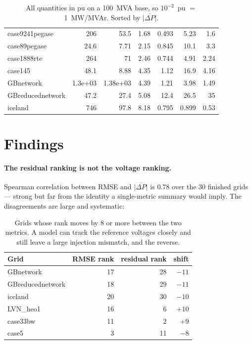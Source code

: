 \documentclass[10pt]{article}
\begin{document}
\begin{table}[H]
\begin{tabular}{lrrrrrr}
case9241pegase & 206 & 53.5 & 1.68 & 0.493 & 5.23 & 1.6 \\
case89pegase & 24.6 & 7.71 & 2.15 & 0.845 & 10.1 & 3.3 \\
case1888rte & 264 & 71 & 2.46 & 0.744 & 4.91 & 2.24 \\
case145 & 48.1 & 8.88 & 4.35 & 1.12 & 16.9 & 4.16 \\
GBnetwork & 1.3e+03 & 1.38e+03 & 4.39 & 1.21 & 3.98 & 1.49 \\
GBreducednetwork & 47.2 & 27.4 & 5.08 & 12.4 & 26.5 & 35 \\
iceland & 746 & 97.8 & 8.18 & 0.795 & 0.899 & 0.53 \\
\bottomrule
\end{tabular}
\caption{All quantities in pu on a 100~MVA base, so $10^{-2}$~pu $=$ 1~MW/MVAr.
Sorted by $\overline{|\Delta P|}$.}
\end{table}

\section{Findings}

\paragraph{The residual ranking is not the voltage ranking.} Spearman
correlation between RMSE and $\overline{|\Delta P|}$ is 0.78 over the 30 finished
grids --- strong but far from the identity a single-metric summary would imply.
The disagreements are large and systematic:

\begin{table}[H]
\centering
\small
\begin{tabular}{lrrr}
\toprule
Grid & RMSE rank & residual rank & shift \\
\midrule
GBnetwork        & 17 & 28 & $-11$ \\
GBreducednetwork & 18 & 29 & $-11$ \\
iceland          & 20 & 30 & $-10$ \\
LVN\_heo1        & 16 &  6 & $+10$ \\
case33bw         & 11 &  2 & $+9$ \\
case5            &  3 & 11 & $-8$ \\
\bottomrule
\end{tabular}
\caption{Grids whose rank moves by 8 or more between the two metrics. A model
can track the reference voltages closely and still leave a large injection
mismatch, and the reverse.}
\end{table}
\end{document}
